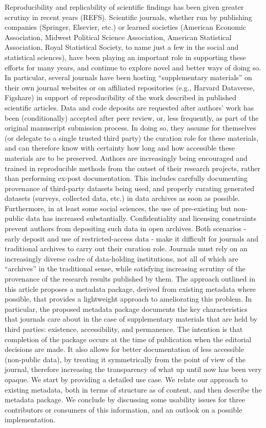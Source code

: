 Reproducibility and replicability of scientific findings has been given greater scrutiny in recent years (REFS). Scientific journals, whether run by publishing companies (Springer, Elsevier, etc.) or learned societies (American Economic Association, Midwest Political Science Association, American Statistical Association, Royal Statistical Society, to name just a few in the social and statistical sciences), have been playing an important role in supporting these efforts for many years, and continue to explore novel and better ways of doing so. In particular, several journals have been hosting ``supplementary materials'' on their own journal websites or on affiliated repositories (e.g., Harvard Dataverse, Figshare) in support of reproducibility of the work described in published scientific articles. Data and code deposits are requested after authors' work has been (conditionally) accepted after peer review, or, less frequently, as part of the original manuscript submission process. In doing so, they assume for themselves (or delegate to a single trusted third party) the curation role for these materials, and can therefore know with certainty how long and how accessible these materials are to be preserved.
Authors are increasingly being encouraged and trained in reproducible methods from the outset of their research projects, rather than performing ex-post documentation. This includes carefully documenting provenance of third-party datasets being used, and properly curating generated datasets (surveys, collected data, etc.) in data archives as soon as possible. Furthermore, in at least some social sciences, the use of pre-existing but non-public data has increased substantially.  Confidentiality and licensing constraints prevent authors from depositing such data in open archives. Both scenarios - early deposit and use of restricted-access data - make it difficult for journals and traditional archives to carry out their curation role. Journals must rely on an increasingly diverse cadre of data-holding institutions, not all of which are ``archives'' in the traditional sense, while satisfying increasing scrutiny of the provenance of the research results published by them. 
The approach outlined in this article proposes a metadata package, derived from existing metadata where possible, that provides a lightweight approach to ameliorating this problem. In particular, the proposed metadata package documents the key characteristics that journals care about in the case of supplementary materials that are held by third parties: existence, accessibility, and permanence. The intention is that completion of the package occurs at the time of publication when the editorial decisions are made. It also allows for better documentation of less accessible (non-public data), by treating it symmetrically from the point of view of the journal, therefore increasing the transparency of what up until now has been very opaque.
We start by providing a detailed use case. We relate our approach to existing metadata, both in terms of structure as of content, and then describe the metadata package. We conclude by discussing some usability issues for three contributors or consumers of this information, and an outlook on a possible implementation.